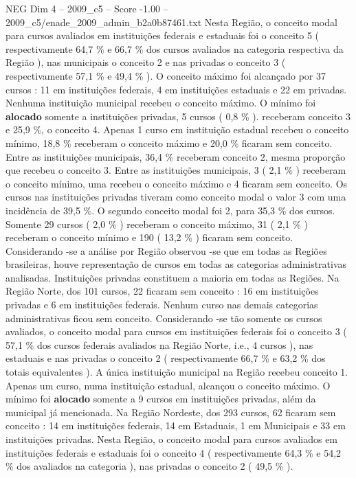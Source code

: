 \begin{textsample}{NEG Dim 4 – 2009\_c5 – Score -1.00 – 2009\_c5/enade\_2009\_admin\_b2a0b87461.txt}
Nesta Região, o conceito modal para cursos avaliados em instituições federais e estaduais foi o conceito 5 ( respectivamente 64,7 \% e 66,7 \% dos cursos avaliados na categoria respectiva da Região ), nas municipais o conceito 2 e nas privadas o conceito 3 ( respectivamente 57,1 \% e 49,4 \% ).
O conceito máximo foi alcançado por 37 cursos : 11 em instituições federais, 4 em instituições estaduais e 22 em privadas.
Nenhuma instituição municipal recebeu o conceito máximo.
O mínimo foi \textbf{alocado} somente a instituições privadas, 5 cursos ( 0,8 \% ). receberam conceito 3 e 25,9 \%, o conceito 4.
Apenas 1 curso em instituição estadual recebeu o conceito mínimo, 18,8 \% receberam o conceito máximo e 20,0 \% ficaram sem conceito.
Entre as instituições municipais, 36,4 \% receberam conceito 2, mesma proporção que recebeu o conceito 3.
Entre as instituições municipais, 3 ( 2,1 \% ) receberam o conceito mínimo, uma recebeu o conceito máximo e 4 ficaram sem conceito.
Os cursos nas instituições privadas tiveram como conceito modal o valor 3 com uma incidência de 39,5 \%.
O segundo conceito modal foi 2, para 35,3 \% dos cursos.
Somente 29 cursos ( 2,0 \% ) receberam o conceito máximo, 31 ( 2,1 \% ) receberam o conceito mínimo e 190 ( 13,2 \% ) ficaram sem conceito.
Considerando -se a análise por Região observou -se que em todas as Regiões brasileiras, houve representação de cursos em todas as categorias administrativas analisadas.
Instituições privadas constituem a maioria em todas as Regiões.
Na Região Norte, dos 101 cursos, 22 ficaram sem conceito : 16 em instituições privadas e 6 em instituições federais.
Nenhum curso nas demais categorias administrativas ficou sem conceito.
Considerando -se tão somente os cursos avaliados, o conceito modal para cursos em instituições federais foi o conceito 3 ( 57,1 \% dos cursos federais avaliados na Região Norte, i.e., 4 cursos ), nas estaduais e nas privadas o conceito 2 ( respectivamente 66,7 \% e 63,2 \% dos totais equivalentes ).
A única instituição municipal na Região recebeu conceito 1.
Apenas um curso, numa instituição estadual, alcançou o conceito máximo.
O mínimo foi \textbf{alocado} somente a 9 cursos em instituições privadas, além da municipal já mencionada.
Na Região Nordeste, dos 293 cursos, 62 ficaram sem conceito : 14 em instituições federais, 14 em Estaduais, 1 em Municipais e 33 em instituições privadas.
Nesta Região, o conceito modal para cursos avaliados em instituições federais e estaduais foi o conceito 4 ( respectivamente 64,3 \% e 54,2 \% dos avaliados na categoria ), nas privadas o conceito 2 ( 49,5 \% ).

\end{textsample}
